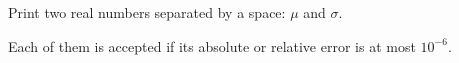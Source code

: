 Print two real numbers separated by a space: $\mu$ and $\sigma$.

Each of them is accepted if its absolute or relative error is at most $10^{-6}$.

